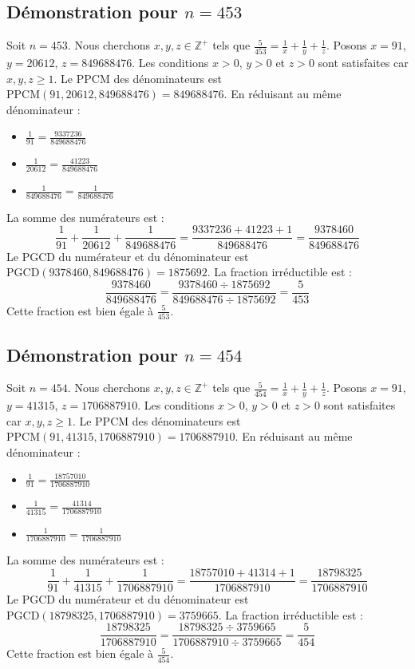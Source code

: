 \documentclass[11pt,a4paper]{article}
\begin{document}
\subsection{Démonstration pour $n = 453$}
Soit $n = 453$. Nous cherchons $x, y, z \in \mathbb{Z}^{+}$ tels que $\frac{5}{453} = \frac{1}{x} + \frac{1}{y} + \frac{1}{z}$.
Posons $x = 91$, $y = 20612$, $z = 849688476$.
Les conditions $x > 0$, $y > 0$ et $z > 0$ sont satisfaites car $x, y, z \geq 1$.
Le PPCM des dénominateurs est $\text{PPCM}(91, 20612, 849688476) = 849688476$.
En réduisant au même dénominateur :
\begin{itemize}
    \item $\frac{1}{91} = \frac{9337236}{849688476}$
    \item $\frac{1}{20612} = \frac{41223}{849688476}$
    \item $\frac{1}{849688476} = \frac{1}{849688476}$
\end{itemize}
La somme des numérateurs est :
$$ \frac{1}{91} + \frac{1}{20612} + \frac{1}{849688476} = \frac{9337236 + 41223 + 1}{849688476} = \frac{9378460}{849688476} $$
Le PGCD du numérateur et du dénominateur est $\text{PGCD}(9378460, 849688476) = 1875692$.
La fraction irréductible est :
$$ \frac{9378460}{849688476} = \frac{9378460 \div 1875692}{849688476 \div 1875692} = \frac{5}{453} $$
Cette fraction est bien égale à $\frac{5}{453}$.

\subsection{Démonstration pour $n = 454$}
Soit $n = 454$. Nous cherchons $x, y, z \in \mathbb{Z}^{+}$ tels que $\frac{5}{454} = \frac{1}{x} + \frac{1}{y} + \frac{1}{z}$.
Posons $x = 91$, $y = 41315$, $z = 1706887910$.
Les conditions $x > 0$, $y > 0$ et $z > 0$ sont satisfaites car $x, y, z \geq 1$.
Le PPCM des dénominateurs est $\text{PPCM}(91, 41315, 1706887910) = 1706887910$.
En réduisant au même dénominateur :
\begin{itemize}
    \item $\frac{1}{91} = \frac{18757010}{1706887910}$
    \item $\frac{1}{41315} = \frac{41314}{1706887910}$
    \item $\frac{1}{1706887910} = \frac{1}{1706887910}$
\end{itemize}
La somme des numérateurs est :
$$ \frac{1}{91} + \frac{1}{41315} + \frac{1}{1706887910} = \frac{18757010 + 41314 + 1}{1706887910} = \frac{18798325}{1706887910} $$
Le PGCD du numérateur et du dénominateur est $\text{PGCD}(18798325, 1706887910) = 3759665$.
La fraction irréductible est :
$$ \frac{18798325}{1706887910} = \frac{18798325 \div 3759665}{1706887910 \div 3759665} = \frac{5}{454} $$
Cette fraction est bien égale à $\frac{5}{454}$.
\end{document}
